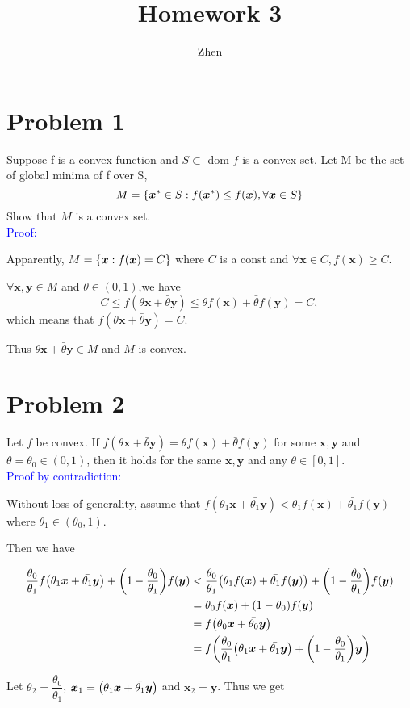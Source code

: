 \documentclass{article}
\def\bx{\boldsymbol{x}}
\def\by{\boldsymbol{y}}
\def\convex#1#2{\theta#1+\bar{\theta}#2}
\def\Eproof{\textcolor{blue}{Proof: }}
\def\Eprco{\textcolor{blue}{Proof by contradiction: }}
\begin{document}
\title{Homework 3}
\author{Zhen}
\maketitle

\section*{Problem 1}
Suppose f is a convex function and $S \subset$ dom $f$ is a convex set. Let M be the set of global minima of f over S,
$$M=\qty{\bx^*\in S:f(\bx^*)\le f(\bx),\forall\bx\in S}$$
Show that $M$ is a convex set.
\\
\Eproof

Apparently, $M=\qty{\bx:f(\bx)=C}$ where $C$ is a const and $\forall \bx\in C,f(\bx)\ge C$.

$\forall \bx,\by\in M$ and $\theta\in(0,1)$,we have
$$C\le f(\convex{\bx}{\by})\le\convex{f(\bx)}{f(\by)}=C,$$
which means that $f(\convex{\bx}{\by})=C$.

Thus $\convex{\bx}{\by}\in M$ and $M$ is convex.

\section*{Problem 2}
Let $f$ be convex. If $f(\convex{\bx}{\by})=\convex{f(\bx)}{f(\by)}$ for some $\bx,\by$ and $\theta=\theta_0\in(0,1)$, then it holds for the same $\bx,\by$ and any $\theta\in[0,1]$.
\\
\Eprco

Without loss of generality, assume that
$f(\theta_1\bx+\bar{\theta_1}\by)<\theta_1f(\bx)+\bar{\theta_1}f(\by)$ where $\theta_1\in(\theta_0,1)$.

Then we have

$$
\begin{aligned}
	\frac{\theta_0}{\theta_1}
	f\qty(\theta_1\bx+\bar{\theta_1}\by)
	+
	\qty(1-\frac{\theta_0}{\theta_1})
	f(\by)
	&<
	\frac{\theta_0}{\theta_1}
	\qty(\theta_1f(\bx)+\bar{\theta_1}f(\by))
	+
	\qty(1-\frac{\theta_0}{\theta_1})
	f(\by)
	\\
	&=
	\theta_0 f(\bx)+(1-\theta_0)f(\by)
	\\
	&=
	f\qty(\theta_0\bx+\bar{\theta_0}\by)
	\\
	&=
	f\qty(
	\frac{\theta_0}{\theta_1}\qty(\theta_1\bx+\bar{\theta_1}\by)+\qty(1-\frac{\theta_0}{\theta_1})\by
)
\end{aligned}
$$

Let $\theta_2=\dfrac{\theta_0}{\theta_1}$, $\bx_1=\qty(\theta_1\bx+\bar{\theta_1}\by)$ and $\bx_2=\by$. Thus we get
\end{document}
